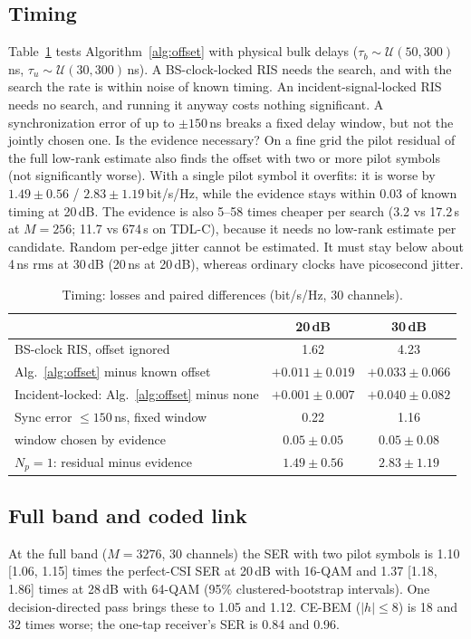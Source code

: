 \documentclass[conference,10pt]{IEEEtran}
\theoremstyle{remark}
\begin{document}
\subsection{Timing}\label{sec:res-timing}
Table~\ref{tab:timing} tests Algorithm~\ref{alg:offset} with physical bulk delays ($\tau_b\sim\mathcal U(50,300)$\,ns,
$\tau_u\sim\mathcal U(30,300)$\,ns). A BS-clock-locked RIS needs the search, and with the search the rate is within
noise of known timing. An incident-signal-locked RIS needs no search, and running it anyway costs nothing significant.
A synchronization error of up to $\pm150$\,ns breaks a fixed delay window, but not the jointly chosen one. Is the evidence
necessary? On a fine grid the pilot residual of the full low-rank estimate also finds the offset with two or more pilot
symbols (not significantly worse). With a single pilot symbol it overfits: it is worse by $1.49\pm0.56$ / $2.83\pm1.19$\,bit/s/Hz,
while the evidence stays within $0.03$ of known timing at 20\,dB. The evidence is also 5--58 times cheaper per search
(3.2 vs 17.2\,s at $M=256$; 11.7 vs 674\,s on TDL-C), because it needs no low-rank estimate per candidate. Random
per-edge jitter cannot be estimated. It must stay below about 4\,ns rms at 30\,dB (20\,ns at 20\,dB), whereas ordinary
clocks have picosecond jitter.

\begin{table}[t]\centering\footnotesize
\caption{Timing: losses and paired differences (bit/s/Hz, 30 channels).}\label{tab:timing}
\setlength{\tabcolsep}{3pt}
\begin{tabular}{@{}lcc@{}}\toprule
 & 20\,dB & 30\,dB\\\midrule
BS-clock RIS, offset ignored & 1.62 & 4.23\\
\quad Alg.~\ref{alg:offset} minus known offset & $+0.011\pm0.019$ & $+0.033\pm0.066$\\
Incident-locked: Alg.~\ref{alg:offset} minus none & $+0.001\pm0.007$ & $+0.040\pm0.082$\\
Sync error $\le150$\,ns, fixed window & 0.22 & 1.16\\
\quad window chosen by evidence & $0.05\pm0.05$ & $0.05\pm0.08$\\
$N_p=1$: residual minus evidence & $1.49\pm0.56$ & $2.83\pm1.19$\\\bottomrule
\end{tabular}
\end{table}

\subsection{Full band and coded link}\label{sec:res-full}
At the full band ($M=3276$, 30 channels) the SER with two pilot symbols is 1.10 [1.06, 1.15] times the perfect-CSI SER
at 20\,dB with 16-QAM and 1.37 [1.18, 1.86] times at 28\,dB with 64-QAM (95\% clustered-bootstrap intervals). One
decision-directed pass brings these to 1.05 and 1.12. CE-BEM ($|h|\le8$) is 18 and 32 times worse; the one-tap
receiver's SER is 0.84 and 0.96.
\end{document}
